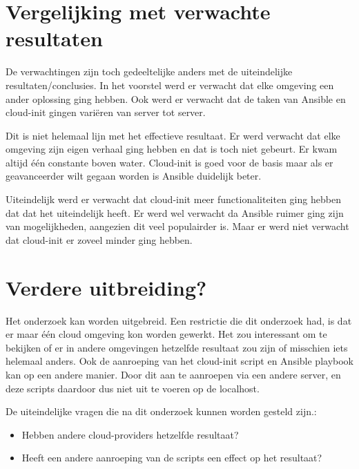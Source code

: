 \section{Vergelijking met verwachte resultaten}
De verwachtingen zijn toch gedeeltelijke anders met de uiteindelijke resultaten/conclusies. In het voorstel werd er verwacht dat elke omgeving een ander oplossing ging hebben. Ook werd er verwacht dat de taken van Ansible en cloud-init gingen variëren van server tot server.

Dit is niet helemaal lijn met het effectieve resultaat. Er werd verwacht dat elke omgeving zijn eigen verhaal ging hebben en dat is toch niet gebeurt. Er kwam altijd één constante boven water. Cloud-init is goed voor de basis maar als er geavanceerder wilt gegaan worden is Ansible duidelijk beter. 

Uiteindelijk werd er verwacht dat cloud-init meer functionaliteiten ging hebben dat dat het uiteindelijk heeft. Er werd wel verwacht da Ansible ruimer ging zijn van mogelijkheden, aangezien dit veel populairder is. Maar er werd niet verwacht dat cloud-init er zoveel minder ging hebben.


\section{Verdere uitbreiding?}
Het onderzoek kan worden uitgebreid. Een restrictie die dit onderzoek had, is dat er maar één cloud omgeving kon worden gewerkt. Het zou interessant om te bekijken of er in andere omgevingen hetzelfde resultaat zou zijn of misschien iets helemaal anders. Ook de aanroeping van het cloud-init script en Ansible playbook kan op een andere manier. Door dit aan te aanroepen via een andere server, en deze scripts daardoor dus niet uit te voeren op de localhost. 

De uiteindelijke vragen die na dit onderzoek kunnen worden gesteld zijn.:
\begin{itemize}
    \item Hebben andere cloud-providers hetzelfde resultaat? 
    \item Heeft een andere aanroeping van de scripts een effect op het resultaat?
\end{itemize}

